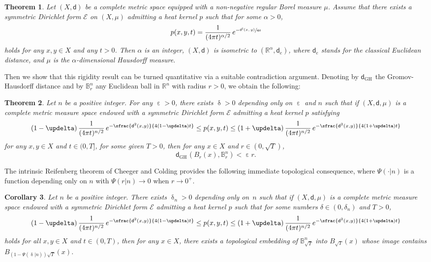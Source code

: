 \documentclass[JEP,XML,SOM,Unicode,published]{cedram}
\newcommand{\sGH}{{\scriptscriptstyle\mathrm{GH}\,}}
\theoremstyle{plain}
\newtheorem{theorem}{Theorem}[section]
\newtheorem{corollary}[theorem]{Corollary}
\theoremstyle{definition}
\newcommand{\setR}{\mathbb{R}}
\newcommand{\setB}{\mathbb{B}}
\newcommand{\cE}{\mathcal{E}}
\newcommand{\dist}{\mathsf{d}}
\begin{document}
\begin{theorem}\label{th:main}
Let $(X,\dist)$ be a complete metric space equipped with a non-negative regular Borel measure $\mu$. Assume that there exists a symmetric Dirichlet form $\cE$ on $(X,\mu)$ admitting a heat kernel $p$ such that for some $\alpha>0$,
\begin{equation}\label{eq:heatkernel}
p(x,y,t) = \frac{1}{(4 \pi t)^{\alpha/2}}\, e^{-\sfrac{\dist^2(x,y)}{4t}}
\end{equation}
holds for any $x,y \in X$ and any $t>0$. Then $\alpha$ is an integer, $(X,\dist)$ is isometric to $(\setR^\alpha,\dist_e)$, where $\dist_e$ stands for the classical Euclidean distance, and $\mu$ is the $\alpha$-dimensional Hausdorff measure.
\end{theorem}

Then we show that this rigidity result can be turned quantitative via a suitable contradiction argument. Denoting by $\dist_{\sGH}$ the Gromov-Hausdorff distance and by $\setB^n_r$ any Euclidean ball in $\setR^n$ with radius $r>0$, we obtain the following:

\begin{theorem}\label{th:almostrigidity} Let $n$ be a positive integer. For any $\upepsilon>0$, there exists $\updelta>0$ depending only on $\upepsilon$ and $n$ such that if $(X,\dist,\mu)$ is a complete metric measure space endowed with a symmetric Dirichlet form $\cE$
admitting a heat kernel $p$ satisfying
\begin{equation}\label{eq:almostheatkernel}
(1-\updelta)\, \frac{1}{(4 \pi t)^{n/2}}\, e^{-\sfrac{\dist^2(x,y)}{4(1-\updelta)t}}\le p(x,y,t) \le (1+\updelta)\, \frac{1}{(4 \pi t)^{n/2}}\, e^{-\sfrac{\dist^2(x,y)}{4(1+\updelta)t}}
\end{equation}
for any $x,y \in X$ and $t \in (0,T]$, for some given $T>0$, then for any $x \in X$ and $r \in (0,\sqrt{T})$,
\begin{equation}%
\dist_{\sGH}\left(B_r(x), \setB^n_r\right)< \upepsilon r.
\end{equation}
\end{theorem}

The intrinsic Reifenberg theorem of Cheeger and Colding \cite[Th.\,A.1.1.]{CheegerColding} provides the following immediate topological consequence, where $\Psi(\cdot|n)$ is a function depending only on $n$ with $\Psi(r|n) \to 0$ when $r \to 0^+$.

\begin{corollary}\label{cor:topo} Let $n$ be a positive integer. There exists $\updelta_n>0$ depending only on~$n$ such that if $(X,\dist,\mu)$ is a complete metric measure space endowed with a symmetric Dirichlet form $\cE$ admitting a heat kernel $p$ such that for some numbers $\delta \in (0,\delta_n)$ and $T>0$,
\[
(1-\updelta)\,\frac{1}{(4 \pi t)^{n/2}}\, e^{-\sfrac{\dist^2(x,y)}{4(1-\updelta) t}}\le p(x,y,t) \le (1+\updelta)\,\frac{1}{(4 \pi t)^{n/2}}\, e^{-\sfrac{\dist^2(x,y)}{4(1+\updelta) t}}
\]holds for all $x, y \in X$ and $t \in (0,T)$, then for any $x \in X$, there exists a topological embedding of $\mathbb{B}_{\sqrt{T}}^{n}$ into $B_{\sqrt{T}}(x)$ whose image contains $B_{(1-\Psi(\updelta|n))\sqrt{T}}(x)$.\end{corollary}
\end{document}
